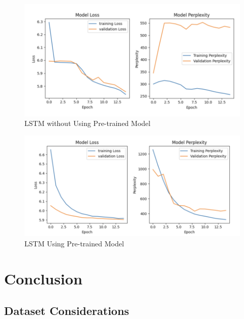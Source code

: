 \documentclass[10pt,twocolumn,letterpaper]{article}
\begin{document}
\begin{figure}[t]
\begin{center}
   \includegraphics[width=1\linewidth]{lstm1.png}
\end{center}
   \caption{LSTM without Using Pre-trained Model}
\label{fig:onecol}
\end{figure}

\begin{figure}[t]
\begin{center}
   \includegraphics[width=1\linewidth]{lstm2.png}
\end{center}
   \caption{LSTM Using Pre-trained Model}
\label{fig:onecol}
\end{figure}

\section{Conclusion}

\subsection{Dataset Considerations}
\end{document}
